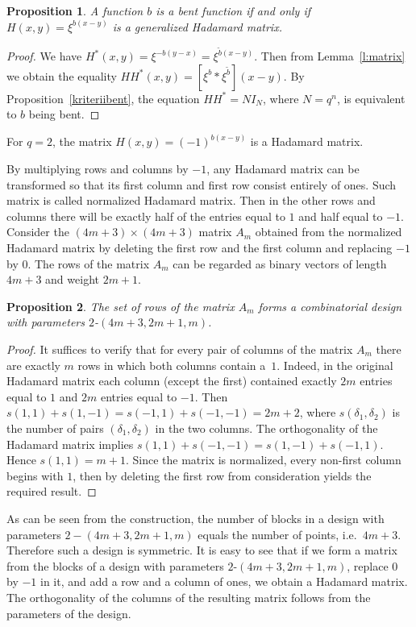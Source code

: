 \documentclass[11pt]{article}
\newtheorem{claim}{Proposition}[section]
\theoremstyle{definition}
\begin{document}
{{{\begin{claim}\label{cl:Hadam}
A function $b$ is a bent function if and only if
$H(x,y)=\xi^{b(x-y)}$ is a generalized Hadamard matrix.
\end{claim}
\begin{proof}
We have $H^*(x,y)=\xi^{-b(y-x)}=\xi^{\tilde{b}(x-y)}$. Then from Lemma~\ref{l:matrix} we obtain the equality
$HH^*(x,y)=[\xi^b*\xi^{\tilde{b}}](x-y)$. By Proposition~\ref{kriteriibent}, the equation $HH^*=NI_N$, where $N=q^n$, is equivalent to $b$ being bent.
\end{proof}


For $q=2$, the matrix $H(x,y)=(-1)^{b(x-y)}$ is a Hadamard matrix.




By multiplying rows and columns by $-1$, any Hadamard matrix can be transformed so that its first column and first row consist entirely of ones. Such matrix is called  normalized Hadamard matrix. Then in the other rows and columns there will be exactly half of the entries equal to $1$ and half equal to $-1$. Consider the $(4m+3)\times (4m+3)$ matrix $A_m$ obtained from the normalized Hadamard matrix by deleting the first row and the first column and replacing $-1$ by $0$. The rows of the matrix $A_m$ can be regarded as binary vectors of length $4m+3$ and weight $2m+1$.

\begin{claim}
The set of rows of the matrix $A_m$ forms a combinatorial design with parameters $2$-$(4m+3,2m+1,m)$.
\end{claim}
\begin{proof}
It suffices to verify that for every pair of columns of the matrix $A_m$ there are exactly $m$ rows in which both columns contain a~$1$. Indeed, in the original Hadamard matrix each column (except the first) contained exactly $2m$ entries equal to $1$ and $2m$ entries equal to $-1$. Then $s(1,1)+s(1,-1)=s(-1,1)+s(-1,-1)=2m+2$, where $s(\delta_1,\delta_2)$ is the number of pairs $(\delta_1,\delta_2)$ in the two columns. The orthogonality of the Hadamard matrix implies $s(1,1)+s(-1,-1)=s(1,-1)+s(-1,1)$. Hence $s(1,1)=m+1$. Since the matrix is normalized, every non-first column begins with $1$, then by deleting the first row from consideration yields the required result.
\end{proof}

As can be seen from the construction, the number of blocks in a design with parameters $2-(4m+3,2m+1,m)$ equals the number of points, i.e.\ $4m+3$. Therefore such a design is symmetric. It is easy to see that if we form a matrix from the blocks of a design with parameters $2$-$(4m+3,2m+1,m)$, replace $0$ by $-1$ in it, and add a row and a column of ones, we obtain a Hadamard matrix. The orthogonality of the columns of the resulting matrix follows from the parameters of the design.

}}}
\end{document}
